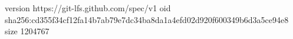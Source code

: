 version https://git-lfs.github.com/spec/v1
oid sha256:cd355f34cf12fa14b7ab79e7dc34ba8da1a4efd02d920f600349b6d3a5ce94e8
size 1204767
